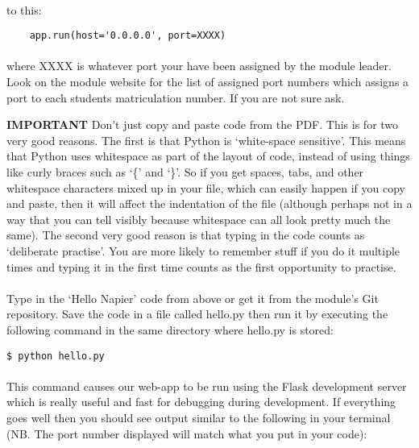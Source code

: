 \documentclass[12pt, a4paper, twoside]{book}
\begin{document}
\paragraph{}to this:
\begin{lstlisting}
    app.run(host='0.0.0.0', port=XXXX)
\end{lstlisting}
\paragraph{}where XXXX is whatever port your have been assigned by the module leader. Look on the module website for the list of assigned port numbers which assigns a port to each students matriculation number. If you are not sure ask.

\begin{framed}
\textbf{IMPORTANT} Don't just copy and paste code from the PDF. This is for two very good reasons. The first is that Python is `white-space sensitive'. This means that Python uses whitespace as part of the layout of code, instead of using things like curly braces such as `\{' and `\}'. So if you get spaces, tabs, and other whitespace characters mixed up in your file, which can easily happen if you copy and paste, then it will affect the indentation of the file (although perhaps not in a way that you can tell visibly because whitespace can all look pretty much the same). The second very good reason is that typing in the code counts as `deliberate practise'. You are more likely to remember stuff if you do it multiple times and typing it in the first time counts as the first opportunity to practise.
\end{framed}

\paragraph{} Type in the `Hello Napier' code from above or get it from the module's Git repository. Save the code in a file called hello.py then run it by executing the following command in the same directory where hello.py is stored:

\begin{lstlisting}[style=DOS]
    $ python hello.py
\end{lstlisting}

\paragraph{} This command causes our web-app to be run using the Flask development server which is really useful and fast for debugging during development. If everything goes well then you should see output similar to the following in your terminal (NB. The port number displayed will match what you put in your code):
\end{document}
